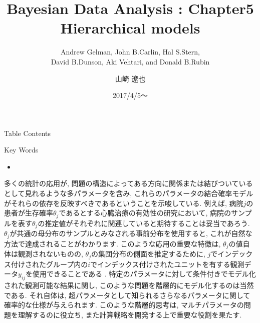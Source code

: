 \documentclass[10pt,dvipdfmx,a4]{beamer}
\title{Bayesian Data Analysis : Chapter5 \\Hierarchical models}
\subtitle{Andrew Gelman, John B.Carlin, Hal S.Stern,\\David B.Dunson, Aki Vehtari, and Donald B.Rubin}
\author{山崎 遼也}
\institute{情報学科 数理工学コース 4回}
\date{2017/4/5～}
\begin{document}
\frame{\titlepage}

\begin{frame}{Table Contents}
\begin{multicols}{2}
{\scriptsize \tableofcontents}
\end{multicols}
\end{frame}

\begin{frame}{Key Words}
\begin{multicols}{2}
{\scriptsize \begin{itemize}
\item 
\end{itemize}}
\end{multicols}
\end{frame}


\begin{frame}
多くの統計の応用が, 問題の構造によってある方向に関係または結びついているとして見れるような多パラメータを含み, これらのパラメータの結合確率モデルがそれらの依存を反映すべきであるということを示唆している.
例えば, 病院$j$の患者が生存確率$\theta_j$であるとする心臓治療の有効性の研究において, 病院のサンプルを表す$\theta_j$の推定値がそれぞれに関連していると期待することは妥当であろう.
$\theta_j$が共通の母分布のサンプルとみなされる事前分布を使用すると, これが自然な方法で達成されることがわかります.
このような応用の重要な特徴は, $\theta_j$の値自体は観測されないものの, $\theta_j$の集団分布の側面を推定するために, $j$でインデックス付けされたグループ内の$i$でインデックス付けされたユニットを有する観測データ$y_{ij}$を使用できることである .
特定のパラメータに対して条件付きでモデル化された観測可能な結果に関し, このような問題を階層的にモデル化するのは当然である.
それ自体は, 超パラメータとして知られるさらなるパラメータに関して確率的な仕様が与えられます.
このような階層的思考は, マルチパラメータの問題を理解するのに役立ち, また計算戦略を開発する上で重要な役割を果たす.
\end{frame}

\end{document}
